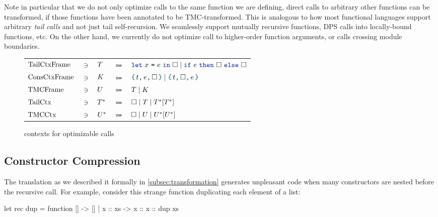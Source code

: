 Note in particular that we do not only optimize calls to the same function we are defining, direct calls to arbitrary other functions can be transformed, if those functions have been annotated to be TMC-transformed.
This is analogous to how most functional languages support arbitrary \emph{tail calls} and not just tail self-recursion. We seamlessly support mutually recursive functions, DPS calls into locally-bound functions, etc. On the other hand, we currently do not optimize call to higher-order function arguments, or calls crossing module boundaries.

\begin{figure}[tp]
    \begin{tabular}{lclcl}
            $\datalangTailFrame[]$
            & $\ni$ &
            $\datalangTailFrame$
            & $\Coloneqq$ &
            $\datalangLet {\datalangVar} {\datalangExpr} \datalangCtxHole \mid \datalangIf \datalangExpr \datalangCtxHole \datalangCtxHole$
\\
            $\datalangConsFrame[]$
            & $\ni$ &
            $\datalangConsFrame$
            & $\Coloneqq$ &
            $\datalangBlock \datalangTag \datalangExpr \datalangCtxHole
            \mid \datalangBlock \datalangTag \datalangCtxHole \datalangExpr$
\\
            $\datalangTMCFrame[]$
            & $\ni$ &
            $\datalangTMCFrame$
            & $\Coloneqq$ &
            $\datalangTailFrame
             \mid
             \datalangConsFrame$
\\
            $\datalangTailCtx[]$
            & $\ni$ &
            $\datalangTailCtx$
            & $\Coloneqq$ &
            $\datalangCtxHole
             \mid
             \datalangTailFrame
             \mid
             \datalangTailCtx{[\datalangTailCtx]}$
\\
            $\datalangTMCCtx[]$
            & $\ni$ &
            $\datalangTMCCtx$
            & $\Coloneqq$ &
            $\datalangCtxHole
             \mid
             \datalangTMCFrame
             \mid
             \datalangTMCCtx{[\datalangTMCCtx]}$
    \end{tabular}
    \caption{\DataLang contexts for optimizable calls}
    \label{fig:contexts}
\end{figure}

\subsection{Constructor Compression} \label{subsec:constructor-compression} The translation as we described it formally in \cref{subsec:transformation} generates unpleasant code when many constructors are nested before the recursive call. For example, consider this strange function duplicating each element of a list:
\begin{Ocaml}
let rec dup = function [] -> [] | x :: xs -> x :: x :: dup xs
\end{Ocaml}

